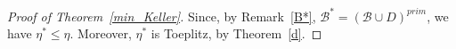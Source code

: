 \documentclass[leqno,a4paper,12pt]{article}
\theoremstyle{definition}
\newtheorem{Remark}[Th]{Remark}
\newcommand{\cM}{{\cal M}}
\newcommand{\sB}{\mathscr{B}}
\begin{document}



\begin{proof}[Proof of Theorem~\ref{min_Keller}]
Since, by Remark~\ref{B*}, $\sB^*=(\sB\cup D)^{prim}$, we have $\eta^*\leq\eta$. Moreover, $\eta^*$ is Toeplitz, by Theorem~\ref{d}.



\end{proof}
\end{document}
